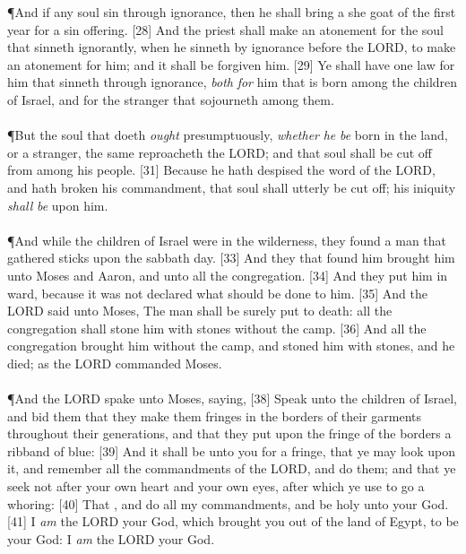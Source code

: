 \P \textcolor[cmyk]{0.99998,1,0,0}{And if any soul sin through ignorance, then he shall bring a she goat of the first year for a sin offering.}
[28] \textcolor[cmyk]{0.99998,1,0,0}{And the priest shall make an atonement for the soul that sinneth ignorantly, when he sinneth by ignorance before the LORD, to make an atonement for him; and it shall be forgiven him.}
[29] \textcolor[cmyk]{0.99998,1,0,0}{Ye shall have one law for him that sinneth through ignorance, \emph{both} \emph{for} him that is born among the children of Israel, and for the stranger that sojourneth among them.}\\
\\
\P \textcolor[cmyk]{0.99998,1,0,0}{But the soul that doeth \emph{ought} presumptuously, \emph{whether} \emph{he} \emph{be} born in the land, or a stranger, the same reproacheth the LORD; and that soul shall be cut off from among his people.}
[31] \textcolor[cmyk]{0.99998,1,0,0}{Because he hath despised the word of the LORD, and hath broken his commandment, that soul shall utterly be cut off; his iniquity \emph{shall} \emph{be} upon him.}\\
\\
\P \textcolor[cmyk]{0.99998,1,0,0}{And while the children of Israel were in the wilderness, they found a man that gathered sticks upon the sabbath day.}
[33] \textcolor[cmyk]{0.99998,1,0,0}{And they that found him  brought him unto Moses and Aaron, and unto all the congregation.}
[34] \textcolor[cmyk]{0.99998,1,0,0}{And they put him in ward, because it was not declared what should be done to him.}
[35] \textcolor[cmyk]{0.99998,1,0,0}{And the LORD said unto Moses, The man shall be surely put to death: all the congregation shall stone him with stones without the camp.}
[36] \textcolor[cmyk]{0.99998,1,0,0}{And all the congregation brought him without the camp, and stoned him with stones, and he died; as the LORD commanded Moses.}\\
\\
\P \textcolor[cmyk]{0.99998,1,0,0}{And the LORD spake unto Moses, saying,}
[38] \textcolor[cmyk]{0.99998,1,0,0}{Speak unto the children of Israel, and bid them that they make them fringes in the borders of their garments throughout their generations, and that they put upon the fringe of the borders a ribband of blue:}
[39] \textcolor[cmyk]{0.99998,1,0,0}{And it shall be unto you for a fringe, that ye may look upon it, and remember all the commandments of the LORD, and do them; and that ye seek not after your own heart and your own eyes, after which ye use to go a whoring:}
[40] \textcolor[cmyk]{0.99998,1,0,0}{That , and do all my commandments, and be holy unto your God.}
[41] \textcolor[cmyk]{0.99998,1,0,0}{I \emph{am} the LORD your God, which brought you out of the land of Egypt, to be your God: I \emph{am} the LORD your God.}